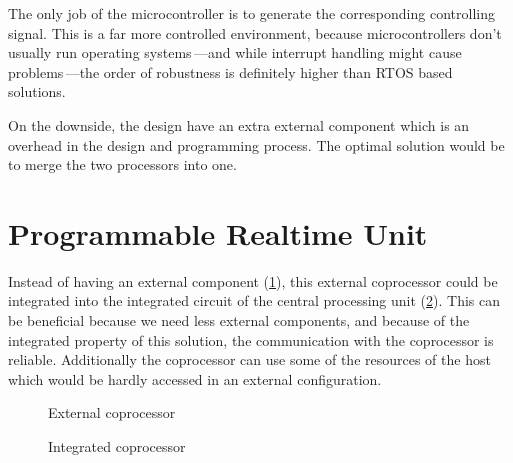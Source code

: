 The only job of the microcontroller is to generate the corresponding controlling signal. This is a far more controlled environment, because microcontrollers don't usually run operating systems\,---and while interrupt handling might cause problems\,---the order of robustness is definitely higher than RTOS based solutions.

On the downside, the design have an extra external component which is an overhead in the design and programming process. The optimal solution would be to merge the two processors into one.

\section{Programmable Realtime Unit}

Instead of having an external component (\cref{fig:ext_controller_hw}), this external coprocessor could be integrated into the integrated circuit of the central processing unit (\cref{fig:int_controller_hw}). This can be beneficial because we need less external components, and because of the integrated property of this solution, the communication with the coprocessor is reliable. Additionally the coprocessor can use some of the resources of the host \cpu which would be hardly accessed in an external configuration.

\begin{figure}[h]
	\centering
	\caption{External coprocessor}
	\label{fig:ext_controller_hw}
\end{figure}

\begin{figure}[h]
	\centering
	\caption{Integrated coprocessor}
	\label{fig:int_controller_hw}
\end{figure}

